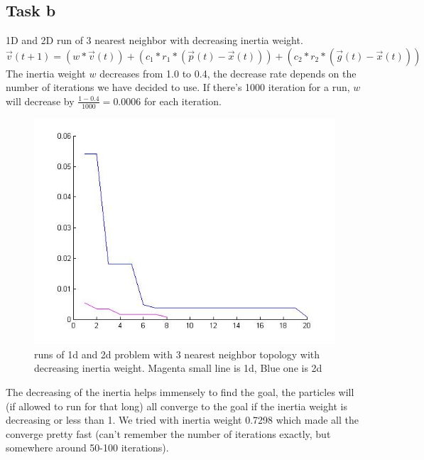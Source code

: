 \documentclass[12pt, a4paper]{article}
\begin{document}
\subsection{Task b}
1D and 2D run of 3 nearest neighbor with decreasing inertia weight.
$\vec{v}(t+1)=(w*\vec{v}(t))+(c_1*r_1*(\vec{p}(t)-\vec{x}(t))) +(c_2*r_2*(\vec{g}(t)-\vec{x}(t)))$\\
The inertia weight $w$ decreases from 1.0 to 0.4, the decrease rate depends on the number of iterations we have decided to use. If there's 1000 iteration for a run, $w$ will decrease by $\frac{1-0.4}{1000} = 0.0006
$ for each iteration.
\begin{figure}[H]
\begin{center}
\includegraphics[width=\linewidth]{3nn_with_inertia}
\caption{runs of 1d and 2d problem with 3 nearest neighbor topology with decreasing inertia weight.
Magenta small line is 1d, Blue one is 2d}
\end{center}
\end{figure}
The decreasing of the inertia helps immensely to find the goal, the particles will (if allowed to run for that long) all converge to the goal if the inertia weight is decreasing or less than 1. We tried with inertia weight 0.7298 which made all the converge pretty fast (can't remember the number of iterations exactly, but somewhere around 50-100 iterations).
\end{document}
